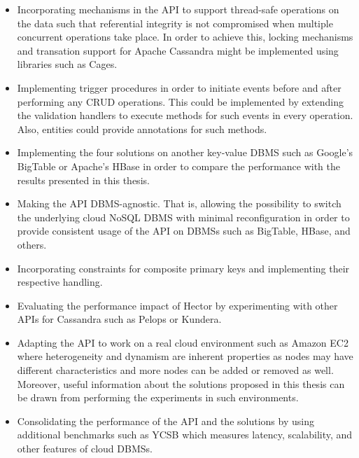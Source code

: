 \begin{itemize}
   \setlength{\itemsep}{0pt}%
  \item Incorporating mechanisms in the \ac{API} to support thread-safe operations
  on the data such that referential integrity is not compromised when multiple
  concurrent operations take place. In order to achieve this, locking mechanisms
  and transation support for Apache Cassandra might be implemented using
  libraries such as Cages.
  
  \item Implementing trigger procedures in order to initiate events before and
  after performing any \ac{CRUD} operations. This could be implemented by
  extending the validation handlers to execute methods for such events in every
  operation. Also, entities could provide annotations for such methods.
  
  \item Implementing the four solutions on another key-value \ac{DBMS} such as
  Google's BigTable or Apache's HBase in order to compare the performance with 
  the results presented in this thesis. 
  
  \item Making the \ac{API} \ac{DBMS}-agnostic. That is, allowing the
  possibility to switch the underlying cloud NoSQL \ac{DBMS} with minimal
  reconfiguration in order to provide consistent usage of the \ac{API} on
  \acp{DBMS} such as BigTable, HBase, and others.
  
  \item Incorporating constraints for composite primary keys and implementing
  their respective handling.
  
  
  \item Evaluating the performance impact of Hector by experimenting with other
  \acp{API} for Cassandra such as Pelops or Kundera.
  
  
  \item Adapting the \ac{API} to work on a real cloud environment such as Amazon
  EC2 where heterogeneity and  dynamism  are inherent properties as nodes may
  have different characteristics and more nodes can be added or
  removed as well.
  Moreover, useful information about the solutions proposed in this thesis 
  can be drawn from performing the experiments in such environments.
  
  \item Consolidating the performance of the \ac{API} and the solutions 
  by using additional benchmarks such as \ac{YCSB} which measures latency,
  scalability, and other features of cloud \acp{DBMS}.
 
 \end{itemize}
  
